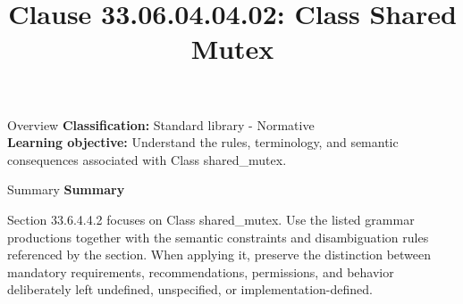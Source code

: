 \documentclass[10pt,letterpaper]{article}
\title{Clause 33.06.04.04.02: Class Shared Mutex}
\author{}
\date{}
\begin{document}
\maketitle
\begin{CornellOverviewBox}{Overview}
\textbf{Classification:} Standard library - Normative\\[2pt]
\textbf{Learning objective:} Understand the rules, terminology, and semantic consequences associated with Class shared\_mutex.
\end{CornellOverviewBox}\begin{CornellSummaryBox}{Summary}
{\sffamily\bfseries\color{Accent} Summary}\par\vspace{3pt}Section 33.6.4.4.2 focuses on Class shared\_mutex. Use the listed grammar productions together with the semantic constraints and disambiguation rules referenced by the section. When applying it, preserve the distinction between mandatory requirements, recommendations, permissions, and behavior deliberately left undefined, unspecified, or implementation-defined.
\end{CornellSummaryBox}
\end{document}
